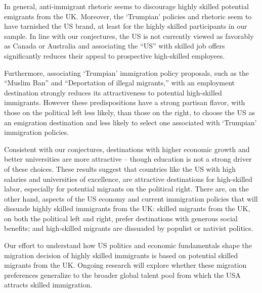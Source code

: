 \documentclass[12pt]{article}
\begin{document}
\par In general, anti-immigrant rhetoric seems to discourage highly skilled potential emigrants from the UK. Moreover, the `Trumpian' policies and rhetoric seem to have tarnished the US brand, at least for the highly skilled participants in our sample. In line with our conjectures, the US is not currently viewed as favorably as Canada or Australia and associating the ``US'' with skilled job offers significantly reduces their appeal to prospective high-skilled employees. 

\par Furthermore, associating `Trumpian' immigration policy proposals, such as the ``Muslim Ban'' and ``Deportation of illegal migrants,'' with an employment destination strongly reduces its attractiveness to potential high-skilled immigrants. However these predispositions have a strong partisan flavor, with those on the political left less likely, than those on the right, to choose the US as an emigration destination and less likely to select one associated with `Trumpian' immigration policies.

\par Consistent with our conjectures, destinations with higher economic growth and better universities are more attractive -- though education is not a strong driver of these choices. These results suggest that countries like the US with high salaries and universities of excellence, are attractive destinations for high-skilled labor, especially for potential migrants on the political right. There are, on the other hand, aspects of the US economy and current immigration policies that will dissuade highly skilled immigrants from the UK: skilled migrants from the UK, on both the political left and right, prefer destinations with generous social benefits; and high-skilled migrants are dissuaded by populist or nativist politics.

\par Our effort to understand how US politics and economic fundamentals shape the migration decision of highly skilled immigrants is based on potential skilled migrants from the UK. Ongoing research will explore whether these migration preferences generalize to the broader global talent pool from which the USA attracts skilled immigration. 
\end{document}
